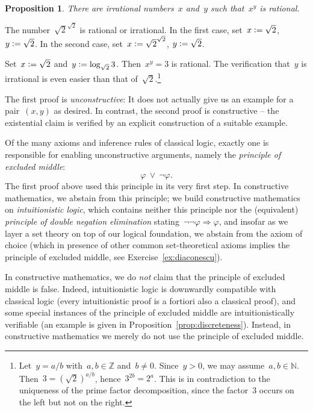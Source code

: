 \documentclass[10pt,reqno,a4paper,openany]{amsbook}
\makeatletter
\theoremstyle{definition}
\theoremstyle{plain}
\newtheorem{prop}[defn]{Proposition}
\theoremstyle{remark}
\newcommand{\ZZ}{\mathbb{Z}}
\newcommand{\NN}{\mathbb{N}}
\newcommand{\?}{\,{:}\,}
\renewcommand{\_}{\mathpunct{.}\,}
\newcommand{\defeq}{\vcentcolon=}
\renewenvironment{proof}[1][\proofname]{\par
  \pushQED{\qed}%
  \normalfont \topsep6\p@\@plus6\p@\relax
  \trivlist
  \item[\hskip\labelsep
        \itshape
    #1\@addpunct{.}]\ignorespaces
}{%
  \popQED\endtrivlist\@endpefalse
}
\makeatother
\begin{document}
\begin{prop}There are irrational numbers~$x$ and~$y$ such that~$x^y$ is
rational.
\end{prop}
\begin{proof}[First proof] The number~$\sqrt{2}^{\sqrt{2}}$ is rational or
irrational. In the first case, set~$x \defeq \sqrt{2}$, $y \defeq \sqrt{2}$.
In the second case, set~$x \defeq \sqrt{2}^{\sqrt{2}}$, $y \defeq \sqrt{2}$.
\end{proof}
\begin{proof}[Second proof] Set~$x \defeq \sqrt{2}$ and~$y \defeq \log_{\sqrt{2}} 3$.
Then~$x^y = 3$ is rational. The verification that~$y$ is irrational is even
easier than that of~$\sqrt{2}$.\footnote{Let~$y = a/b$ with~$a, b \in \ZZ$
and~$b \neq 0$. Since~$y > 0$, we may assume~$a, b \in \NN$. Then~$3 =
(\sqrt{2})^{a/b}$, hence~$3^{2b} = 2^a$. This is in contradiction to the
uniqueness of the prime factor decomposition, since the factor~$3$ occurs on
the left but not on the right.}
\end{proof}

The first proof is \emph{unconstructive}: It does not actually give us an
example for a pair~$(x,y)$ as desired. In contrast, the second proof is
constructive -- the existential claim is verified by an explicit construction
of a suitable example.

Of the many axioms and inference rules of classical logic, exactly one is
responsible for enabling unconstructive arguments, namely the \emph{principle
of excluded middle}:
\[ \varphi \ \vee\ \neg\varphi. \]
The first proof above used this principle in its very first step. In
constructive mathematics, we abstain from this principle; we build
constructive mathematics on \emph{intuitionistic logic}, which contains neither
this principle nor the (equivalent) \emph{principle of double negation
elimination} stating~$\neg\neg\varphi \Rightarrow \varphi$, and insofar as we
layer a set theory on top of our logical foundation, we abstain from the axiom
of choice (which in presence of other common set-theoretical axioms implies the
principle of excluded middle, see Exercise~\ref{ex:diaconescu}).

In constructive mathematics, we do \emph{not} claim that the principle of
excluded middle is false. \marginpar{\dbend}
Indeed, intuitionistic logic is downwardly compatible
with classical logic (every intuitionistic proof is a fortiori also a classical
proof), and some special instances of the principle of excluded middle are
intuitionistically verifiable (an example is given in
Proposition~\ref{prop:discreteness}). Instead, in constructive mathematics we
merely do not use the principle of excluded middle.
\end{document}
